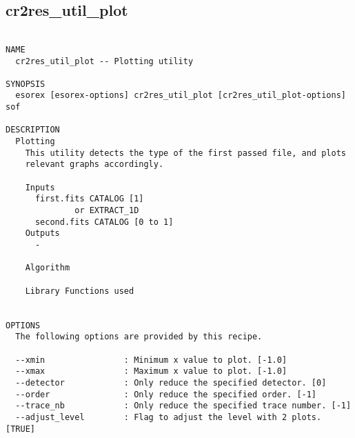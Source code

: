 \subsection{cr2res\_util\_plot}
\begin{verbatim}

NAME
  cr2res_util_plot -- Plotting utility

SYNOPSIS
  esorex [esorex-options] cr2res_util_plot [cr2res_util_plot-options] sof

DESCRIPTION
  Plotting                                                                
    This utility detects the type of the first passed file, and plots     
    relevant graphs accordingly.                                          
                                                                          
    Inputs                                                                
      first.fits CATALOG [1]                           
              or EXTRACT_1D                            
      second.fits CATALOG [0 to 1]                     
    Outputs                                                               
      -                                                                   
                                                                          
    Algorithm                                                             
                                                                          
    Library Functions used                                                
  

OPTIONS
  The following options are provided by this recipe.

  --xmin                : Minimum x value to plot. [-1.0]
  --xmax                : Maximum x value to plot. [-1.0]
  --detector            : Only reduce the specified detector. [0]
  --order               : Only reduce the specified order. [-1]
  --trace_nb            : Only reduce the specified trace number. [-1]
  --adjust_level        : Flag to adjust the level with 2 plots. [TRUE]

\end{verbatim}
